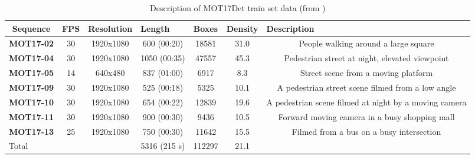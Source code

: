 \begin{table}[H]
\scriptsize 
\begin{tabular}{|c|c|c|c|c|c|c|}
\hline
\textbf{Sequence}           & \textbf{FPS}          & \multicolumn{1}{l|}{\textbf{Resolution}} & \multicolumn{1}{l|}{\textbf{Length}} & \multicolumn{1}{l|}{\textbf{Boxes}} & \multicolumn{1}{l|}{\textbf{Density}} & \multicolumn{1}{l|}{\textbf{Description}}             \\ \hline
\textbf{MOT17-02}           & 30                    & 1920x1080                                & 600 (00:20)                          & 18581                               & 31.0                                  & People walking around a large square                  \\ \hline
\textbf{MOT17-04}           & 30                    & 1920x1080                                & 1050 (00:35)                         & 47557                               & 45.3                                  & Pedestrian street at night, elevated viewpoint        \\ \hline
\textbf{MOT17-05}           & 14                    & 640x480                                  & 837 (01:00)                          & 6917                                & 8.3                                   & Street scene from a moving platform                   \\ \hline
\textbf{MOT17-09}           & 30                    & 1920x1080                                & 525 (00:18)                          & 5325                                & 10.1                                  & A pedestrian street scene filmed from a low angle     \\ \hline
\textbf{MOT17-10}           & 30                    & 1920x1080                                & 654 (00:22)                          & 12839                               & 19.6                                  & A pedestrian scene filmed at night by a moving camera \\ \hline
\textbf{MOT17-11}           & 30                    & 1920x1080                                & 900 (00:30)                          & 9436                                & 10.5                                  & Forward moving camera in a busy shopping mall         \\ \hline
\textbf{MOT17-13}           & 25                    & 1920x1080                                & 750 (00:30)                          & 11642                               & 15.5                                  & Filmed from a bus on a busy intersection              \\ \hline
\multicolumn{1}{|l|}{Total} & \multicolumn{1}{l|}{} & \multicolumn{1}{l|}{}                    & 5316 (215 s)                         & 112297                              & 21.1                                  & \multicolumn{1}{l|}{}                                 \\ \hline
\end{tabular}
\caption{Description of MOT17Det train set data (from \cite{mot17detweb})}
\label{tab:annex_3}
\end{table}
